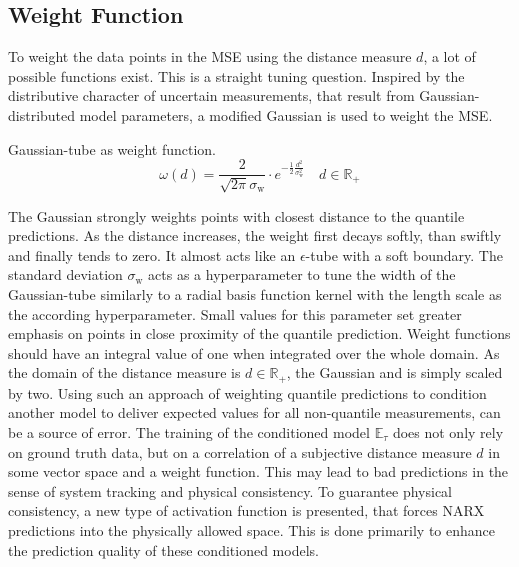 \subsection{Weight Function}

To weight the data points in the MSE using the distance measure $d$, a lot of possible functions exist.
This is a straight tuning question. Inspired by the distributive character of uncertain measurements, that 
result from Gaussian-distributed model parameters, a modified Gaussian is used to weight the MSE.
\begin{definition} Gaussian-tube as weight function.
    \label{sur:def: gaussian weight function}
    \[
    \omega(d) = \frac{2}{\sqrt{2 \pi} \sigma_\text{w}} \cdot e^{-\frac{1}{2} \frac{d^2}{\sigma_\text{w}^2}} 
    \quad d \in \mathbb{R}_+ 
    \]
\end{definition}

\noindent
The Gaussian strongly weights points with closest distance to the quantile predictions. As the distance increases,
the weight first decays softly, than swiftly and finally tends to zero. It almost acts like an $\epsilon$-tube
with a soft boundary. The standard deviation $\sigma_\text{w}$ acts as a hyperparameter to tune the width of the 
Gaussian-tube similarly to a radial basis function kernel with the length scale as the according hyperparameter.
Small values for this parameter set greater emphasis on points in close proximity of
the quantile prediction. Weight functions should have an integral value of one when integrated over the whole domain.
As the domain of the distance measure is $d \in \mathbb{R}_+$, the Gaussian and is simply scaled by two.
\newline
\newline
Using such an approach of weighting quantile predictions to condition another model to deliver expected values
for all non-quantile measurements, can be a source of error. The training of the conditioned model $\mathbb{E}_\tau$
does not only rely on ground truth data, but on a correlation of a subjective distance measure $d$ in some vector space
and a weight function. This may lead to bad predictions in the sense of system tracking and physical consistency.
To guarantee physical consistency, a new type of activation function is presented, that forces NARX predictions
into the physically allowed space. This is done primarily to enhance the prediction quality of these conditioned 
models.


 
